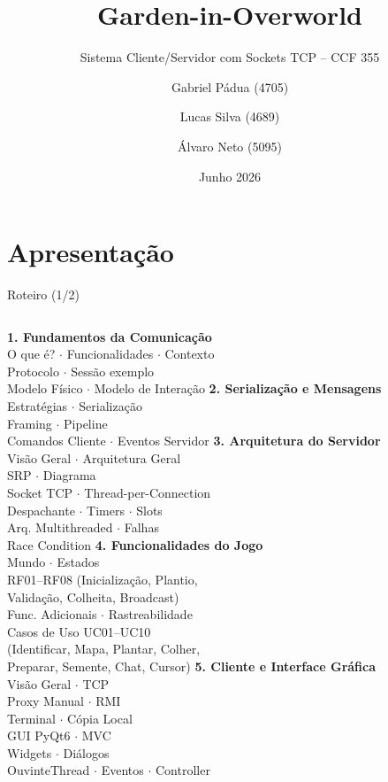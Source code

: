 \documentclass[aspectratio=169]{beamer}
\title{Garden-in-Overworld}
\subtitle{Sistema Cliente/Servidor com Sockets TCP -- CCF 355}
\author{Gabriel P\'adua (4705) \and Lucas Silva (4689) \and \'Alvaro Neto (5095)}
\institute{UFV -- Campus Florestal \\ Bacharelado em Ci\^encia da Computa\c{c}\~ao}
\date{Junho 2026}
\begin{document}
\section{Apresenta\c{c}\~ao}

\begin{frame}
  \titlepage
\end{frame}

\begin{frame}{Roteiro (1/2)}
  \footnotesize
  \begin{columns}
    \textbf{1. Fundamentos da Comunica\c{c}\~ao} \\
    \quad O que \'e? $\cdot$ Funcionalidades $\cdot$ Contexto \\
    \quad Protocolo $\cdot$ Sess\~ao exemplo \\
    \quad Modelo F\'isico $\cdot$ Modelo de Intera\c{c}\~ao
    \vfill
    \textbf{2. Serializa\c{c}\~ao e Mensagens} \\
    \quad Estrat\'egias $\cdot$ Serializa\c{c}\~ao \\
    \quad Framing $\cdot$ Pipeline \\
    \quad Comandos Cliente $\cdot$ Eventos Servidor
    \vfill
    \textbf{3. Arquitetura do Servidor} \\
    \quad Vis\~ao Geral $\cdot$ Arquitetura Geral \\
    \quad SRP $\cdot$ Diagrama \\
    \quad Socket TCP $\cdot$ Thread-per-Connection \\
    \quad Despachante $\cdot$ Timers $\cdot$ Slots \\
    \quad Arq. Multithreaded $\cdot$ Falhas \\
    \quad Race Condition
    \textbf{4. Funcionalidades do Jogo} \\
    \quad Mundo $\cdot$ Estados \\
    \quad RF01--RF08 (Inicializa\c{c}\~ao, Plantio, \\
    \quad \hfill Valida\c{c}\~ao, Colheita, Broadcast) \\
    \quad Func. Adicionais $\cdot$ Rastreabilidade \\
    \quad Casos de Uso UC01--UC10 \\
    \quad (Identificar, Mapa, Plantar, Colher, \\
    \quad \hfill Preparar, Semente, Chat, Cursor)
    \vfill
    \textbf{5. Cliente e Interface Gr\'afica} \\
    \quad Vis\~ao Geral $\cdot$ TCP \\
    \quad Proxy Manual $\cdot$ RMI \\
    \quad Terminal $\cdot$ C\'opia Local \\
    \quad GUI PyQt6 $\cdot$ MVC \\
    \quad Widgets $\cdot$ Di\'alogos \\
    \quad OuvinteThread $\cdot$ Eventos $\cdot$ Controller
  \end{columns}
\end{frame}
\end{document}
